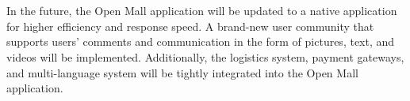 \documentclass{article}
\begin{document}
\\\\
In the future, the Open Mall application will be updated to a native application for higher efficiency and response speed. A brand-new user community that supports users’ comments and communication in the form of pictures, text, and videos will be implemented. Additionally, the logistics system, payment gateways, and multi-language system will be tightly integrated into the Open Mall application. 



\end{document}
